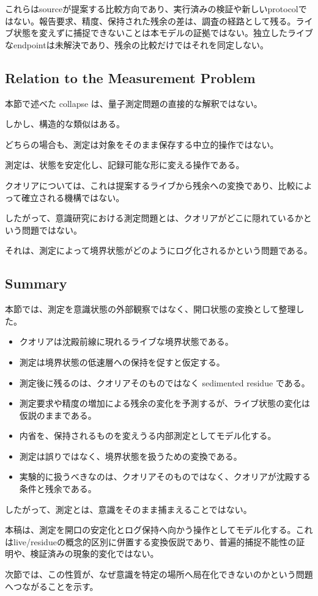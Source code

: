 これらはsourceが提案する比較方向であり、実行済みの検証や新しいprotocolではない。報告要求、精度、保持された残余の差は、調査の経路として残る。ライブ状態を変えずに捕捉できないことは本モデルの証拠ではない。独立したライブなendpointは未解決であり、残余の比較だけではそれを同定しない。

\subsection{Relation to the Measurement Problem}

本節で述べた collapse は、量子測定問題の直接的な解釈ではない。

しかし、構造的な類似はある。

どちらの場合も、測定は対象をそのまま保存する中立的操作ではない。

測定は、状態を安定化し、記録可能な形に変える操作である。

クオリアについては、これは提案するライブから残余への変換であり、比較によって確立される機構ではない。

したがって、意識研究における測定問題とは、クオリアがどこに隠れているかという問題ではない。

それは、測定によって境界状態がどのようにログ化されるかという問題である。

\subsection{Summary}

本節では、測定を意識状態の外部観察ではなく、開口状態の変換として整理した。

\begin{itemize}
\item クオリアは沈殿前線に現れるライブな境界状態である。
\item 測定は境界状態の低速層への保持を促すと仮定する。
\item 測定後に残るのは、クオリアそのものではなく sedimented residue である。
\item 測定要求や精度の増加による残余の変化を予測するが、ライブ状態の変化は仮説のままである。
\item 内省を、保持されるものを変えうる内部測定としてモデル化する。
\item 測定は誤りではなく、境界状態を扱うための変換である。
\item 実験的に扱うべきなのは、クオリアそのものではなく、クオリアが沈殿する条件と残余である。
\end{itemize}

したがって、測定とは、意識をそのまま捕まえることではない。

本稿は、測定を開口の安定化とログ保持へ向かう操作としてモデル化する。これはlive/residueの概念的区別に併置する変換仮説であり、普遍的捕捉不能性の証明や、検証済みの現象的変化ではない。

次節では、この性質が、なぜ意識を特定の場所へ局在化できないのかという問題へつながることを示す。
